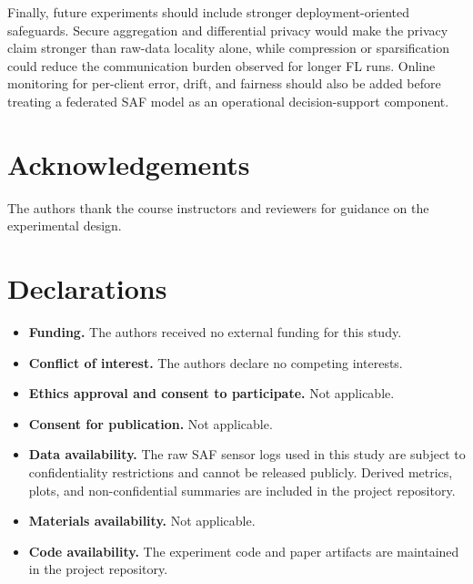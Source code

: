 \documentclass[pdflatex,sn-mathphys-num]{sn-jnl}
\theoremstyle{thmstyleone}%
\theoremstyle{thmstyletwo}%
\theoremstyle{thmstylethree}%
\begin{document}
Finally, future experiments should include stronger deployment-oriented safeguards. Secure aggregation and differential privacy would make the privacy claim stronger than raw-data locality alone, while compression or sparsification could reduce the communication burden observed for longer FL runs. Online monitoring for per-client error, drift, and fairness should also be added before treating a federated SAF model as an operational decision-support component.

\backmatter

\section*{Acknowledgements}

The authors thank the course instructors and reviewers for guidance on the experimental design.

\section*{Declarations}

\begin{itemize}
    \item \textbf{Funding.} The authors received no external funding for this study.
    \item \textbf{Conflict of interest.} The authors declare no competing interests.
    \item \textbf{Ethics approval and consent to participate.} Not applicable.
    \item \textbf{Consent for publication.} Not applicable.
    \item \textbf{Data availability.} The raw SAF sensor logs used in this study are subject to confidentiality restrictions and cannot be released publicly. Derived metrics, plots, and non-confidential summaries are included in the project repository.
    \item \textbf{Materials availability.} Not applicable.
    \item \textbf{Code availability.} The experiment code and paper artifacts are maintained in the project repository.
\end{itemize}


\end{document}
